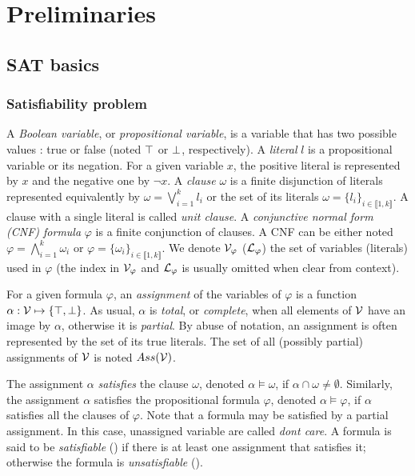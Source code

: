 \chapter{Preliminaries}\label{chap:preliminaries}

\section{SAT basics}

\subsection{Satisfiability problem}
A \emph{Boolean variable}, or \emph{propositional variable}, is a variable that
has two possible values : true or false (noted $\top$ or $\bot$,
respectively).  A \emph{literal} $l$ is a propositional variable or its
negation. For a given variable $x$, the positive literal is represented by $x$
and the negative one by $\neg x$.
A \emph{clause} $\omega$ is a finite disjunction of literals represented
equivalently by $\omega = \bigvee_{i=1}^k l_i$ or the set of its literals
$\omega = \{l_i\}_{i \in \llbracket 1,k \rrbracket}$. A clause with a single
literal is called \emph{unit clause}.
A \emph{conjunctive normal form (CNF) formula} $\varphi$ is a finite
conjunction of clauses.  A CNF can be either noted $\varphi = \bigwedge_{i=1}^k
\omega_i$ or $\varphi = \{\omega_i\}_{i \in \llbracket 1,k \rrbracket}$. We
denote $\mathcal{V}_\varphi$ ($\mathcal{L}_\varphi$) the set of variables (literals) used in
$\varphi$ (the index in $\mathcal{V}_\varphi$ and $\mathcal{L}_\varphi$ is usually omitted when
clear from context).

For a given formula $\varphi$, an \emph{assignment} of the variables of
$\varphi$ is a function $\alpha: \mathcal{V} \mapsto \{ \top, \bot \}$.  As usual, $\alpha$ is
\emph{total}, or \emph{complete}, when all elements of $\mathcal{V}$ have an image by
$\alpha$, otherwise it is \emph{partial}. By abuse of notation, an assignment is
often represented by the set of its true literals.  The set of all (possibly
partial) assignments of $\mathcal{V}$ is noted $Ass(\mathcal{V})$.

The assignment $\alpha$ \emph{satisfies} the clause $\omega$, denoted $\alpha
\models \omega$, if $\alpha \cap \omega \neq \emptyset$. Similarly, the assignment
$\alpha$ satisfies the propositional formula $\varphi$, denoted $\alpha \models
\varphi$, if $\alpha$ satisfies all the clauses of $\varphi$. Note that a
formula may be satisfied by a partial assignment. In this case, unassigned variable are called
\emph{dont care}.
A formula is said to be
\emph{satisfiable} (\sat) if there is at least one assignment that satisfies it;
otherwise the formula is \emph{unsatisfiable} (\unsat).

